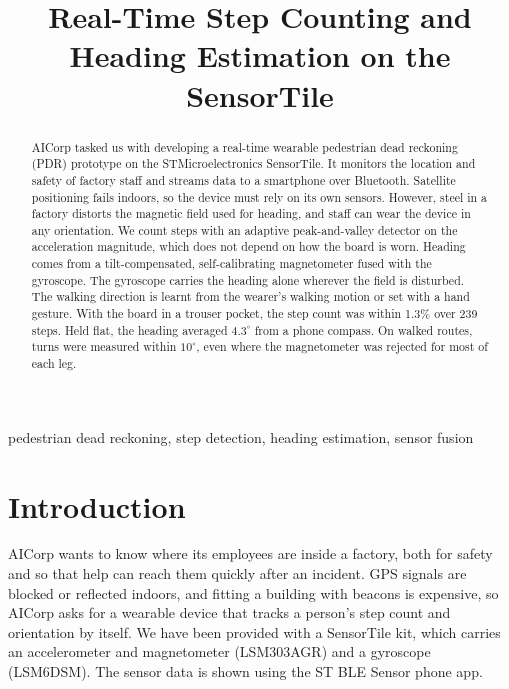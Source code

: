 \documentclass[conference,a4paper]{IEEEtran}
\begin{document}
\pagestyle{plain}

\title{Real-Time Step Counting and Heading Estimation on the SensorTile}

\author{
}

\maketitle
\thispagestyle{plain}

\begin{abstract}
AICorp tasked us with developing a real-time wearable pedestrian dead reckoning (PDR)
prototype on the STMicroelectronics SensorTile. It monitors the location and safety of factory
staff and streams data to a smartphone over Bluetooth. Satellite positioning fails indoors, so
the device must rely on its own sensors. However, steel in a factory distorts the magnetic
field used for heading, and staff can wear the device in any orientation. We count steps with
an adaptive peak-and-valley detector on the acceleration magnitude, which does not depend on
how the board is worn. Heading comes from a tilt-compensated, self-calibrating magnetometer
fused with the gyroscope. The gyroscope carries the heading alone wherever the field is
disturbed. The walking direction is learnt from the wearer's walking motion or set with a
hand gesture. With the board in a trouser pocket, the step count was within 1.3\% over 239
steps. Held flat, the heading averaged $4.3^\circ$ from a phone compass. On walked routes,
turns were measured within $10^\circ$, even where the magnetometer was rejected for most of
each leg.
\end{abstract}

\begin{IEEEkeywords}
pedestrian dead reckoning, step detection, heading estimation, sensor fusion
\end{IEEEkeywords}

\section{Introduction}
AICorp wants to know where its employees are inside a factory, both for safety and so that
help can reach them quickly after an incident. GPS signals are blocked or reflected indoors,
and fitting a building with beacons is expensive, so AICorp asks for a wearable device that
tracks a person's step count and orientation by itself. We have been provided with a SensorTile kit,
which carries an accelerometer and magnetometer (LSM303AGR) and a gyroscope (LSM6DSM). The
sensor data is shown using the ST BLE Sensor phone app.
\end{document}
